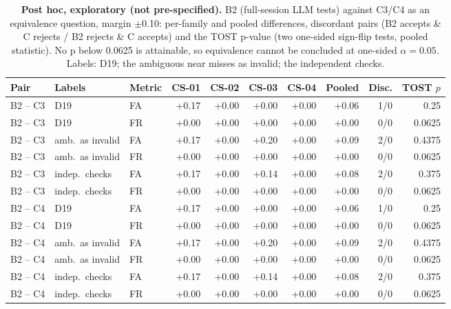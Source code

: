 \begin{table}[t]\centering\scriptsize
\caption{\textbf{Post hoc, exploratory (not pre-specified).} B2 (full-session LLM tests) against C3/C4 as an equivalence question, margin $\pm$0.10: per-family and pooled differences, discordant pairs (B2 accepts \& C rejects / B2 rejects \& C accepts) and the TOST p-value (two one-sided sign-flip tests, pooled statistic). No p below 0.0625 is attainable, so equivalence cannot be concluded at one-sided $\alpha=0.05$. Labels: D19; the ambiguous near misses as invalid; the independent checks.}\label{tab:expl-equivalence}
\begin{tabular}{lllrrrrrrr}\toprule Pair & Labels & Metric & CS-01 & CS-02 & CS-03 & CS-04 & Pooled & Disc. & TOST $p$ \\\midrule
B2 -- C3 & D19 & FA & +0.17 & +0.00 & +0.00 & +0.00 & +0.06 & 1/0 & 0.25 \\
B2 -- C3 & D19 & FR & +0.00 & +0.00 & +0.00 & +0.00 & +0.00 & 0/0 & 0.0625 \\
B2 -- C3 & amb.\ as invalid & FA & +0.17 & +0.00 & +0.20 & +0.00 & +0.09 & 2/0 & 0.4375 \\
B2 -- C3 & amb.\ as invalid & FR & +0.00 & +0.00 & +0.00 & +0.00 & +0.00 & 0/0 & 0.0625 \\
B2 -- C3 & indep.\ checks & FA & +0.17 & +0.00 & +0.14 & +0.00 & +0.08 & 2/0 & 0.375 \\
B2 -- C3 & indep.\ checks & FR & +0.00 & +0.00 & +0.00 & +0.00 & +0.00 & 0/0 & 0.0625 \\
B2 -- C4 & D19 & FA & +0.17 & +0.00 & +0.00 & +0.00 & +0.06 & 1/0 & 0.25 \\
B2 -- C4 & D19 & FR & +0.00 & +0.00 & +0.00 & +0.00 & +0.00 & 0/0 & 0.0625 \\
B2 -- C4 & amb.\ as invalid & FA & +0.17 & +0.00 & +0.20 & +0.00 & +0.09 & 2/0 & 0.4375 \\
B2 -- C4 & amb.\ as invalid & FR & +0.00 & +0.00 & +0.00 & +0.00 & +0.00 & 0/0 & 0.0625 \\
B2 -- C4 & indep.\ checks & FA & +0.17 & +0.00 & +0.14 & +0.00 & +0.08 & 2/0 & 0.375 \\
B2 -- C4 & indep.\ checks & FR & +0.00 & +0.00 & +0.00 & +0.00 & +0.00 & 0/0 & 0.0625 \\
\bottomrule\end{tabular}\end{table}
